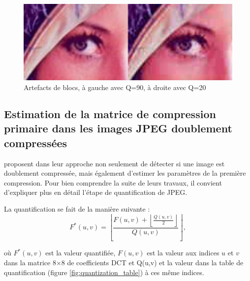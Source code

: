 \documentclass[utf8,final]{stageM2R} %
\begin{document}
\begin{figure}[H]
  \begin{center}
    \includegraphics[width=120mm]{images/eyes.png}
    \caption{Artefacts de blocs, à gauche avec Q=90, à droite avec Q=20}
    \label{fig:blocs_artefacts}
  \end{center}
\end{figure}


\subsection{Estimation de la matrice de compression primaire dans les images JPEG doublement compressées}
\label{estimation_matrice_compression}


 \autocite{lukavs2003estimation} proposent dans leur approche non seulement de détecter si une image est doublement compressée, mais également d'estimer les paramètres de la première compression. Pour bien comprendre la suite de leurs travaux, il convient d'expliquer plus en détail l'étape de quantification de JPEG.

La quantification se fait de la manière suivante :
\begin{equation}
  F^*(u,v) = \left \lfloor \frac{F(u,v) + \left \lfloor \frac{Q(u,v)}{2} \right \rfloor }{Q(u,v)} \right \rfloor,
  \label{eqn:quantization}
\end{equation}

où $F^*(u,v)$ est la valeur quantifiée, $F(u,v)$ est la valeur aux indices $u$ et $v$ dans la matrice 8$\times$8 de coefficients DCT et Q(u,v) et la valeur dans la table de quantification (figure \ref{fig:quantization_table}) à ces même indices.
\end{document}
